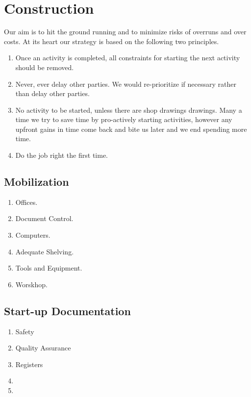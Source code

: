\chapter{Construction}

Our aim is to hit the ground running and to minimize risks of overruns and over costs. At its heart our strategy is based on the following two principles.

\begin{enumerate}
\item Once an activity is completed, all constraints for starting the next activity should be removed. 
\item Never, ever delay other parties. We would re-prioritize if necessary rather than delay other parties.
\item No activity to be started, unless there are shop drawings drawings. Many a time we try to save time by pro-actively starting activities, however any upfront gains in time come back and bite us later and we end spending more time.
\item Do the job right the first time.
\end{enumerate}

\section{Mobilization}

\begin{enumerate}
\item Offices.
\item Document Control.
\item Computers.
\item Adequate Shelving.
\item Tools and Equipment.
\item Worskhop.
\end{enumerate}

\section{Start-up Documentation}

\begin{enumerate}
\item Safety
\item Quality Assurance
\item Registers
\item 
\item 
\end{enumerate}

